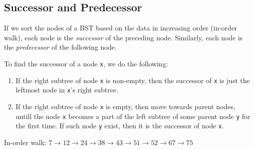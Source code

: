 \documentclass[a4paper,11pt]{book}
\begin{document}
\subsection{Successor and Predecessor}

\noindent If we sort the nodes of a BST based on the data in increasing order (in-order walk), each node is the \textit{successor} of the preceding node. Similarly, each node is the \textit{predecessor} of the following node.

\noindent To find the successor of a node \lstinline{x}, we do the following:
\begin{enumerate}
\item If the right subtree of node \lstinline{x} is non-empty, then the successor of \lstinline{x} is just the leftmost node in \lstinline{x}'s right subtree.
\item If the right subtree of node \lstinline{x} is empty, then move towards parent nodes, untill the node \lstinline{x} becomes a part of the left subtree of some parent node \lstinline{y} for the first time. If such node \lstinline{y} exist, then it is the successor of node \lstinline{x}.
\end{enumerate}

\begin{center}
\end{center}

In-order walk: $ 7 \rightarrow  12 \rightarrow  24 \rightarrow  38 \rightarrow  43 \rightarrow  51 \rightarrow  52 \rightarrow  67 \rightarrow  75 $

\vspace{5mm} 
\end{document}
